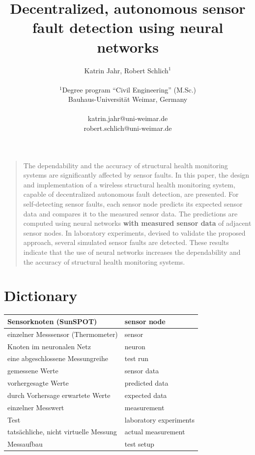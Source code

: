 \documentclass[12pt]{scrartcl}
\title{\textbf{ \Large{Decentralized, autonomous sensor fault detection using neural networks}} }
\author
{Katrin Jahr, Robert Schlich$^{1}$\\
\\
\normalsize{$^{1}$Degree program “Civil Engineering” (M.Sc.)}\\
\normalsize{Bauhaus-Universität Weimar, Germany}\\
\\
\normalsize{katrin.jahr@uni-weimar.de}\\
\normalsize{robert.schlich@uni-weimar.de}
}
\date{}
\newenvironment{sciabstract}{%
\begin{quote} \bfseries}
{\end{quote}}
\begin{document}
 


\baselineskip24pt


\maketitle 




\begin{sciabstract}

The dependability and the accuracy of structural health monitoring systems are significantly affected by sensor faults. 
In this paper, the design and implementation of a wireless structural health monitoring system, capable of decentralized autonomous fault detection, are presented. 
For self-detecting sensor faults, each sensor node predicts its expected sensor data and compares it to the measured sensor data. 
The predictions are computed using neural networks \textbf{with measured sensor data} of adjacent sensor nodes.
In laboratory experiments, devised to validate the proposed approach, several simulated sensor faults are detected.
These results indicate that the use of neural networks increases the dependability and the accuracy of structural health monitoring systems.

\end{sciabstract}


\linenumbers %
\section*{Dictionary}

\begin{tabular}{|l|l|}
\hline 
Sensorknoten (SunSPOT) & sensor node \\ 
\hline 
einzelner Messsensor (Thermometer) & sensor \\ 
\hline 
Knoten im neuronalen Netz & neuron \\ 
\hline 
eine abgeschlossene Messungreihe & test run \\ 
\hline 
gemessene Werte & sensor data \\ 
\hline 
vorhergesagte Werte & predicted data \\ 
\hline 
durch Vorhersage erwartete Werte & expected data \\ 
\hline 
einzelner Messwert & measurement \\ 
\hline 
Test & laboratory experiments\\ 
\hline
tatsächliche, nicht virtuelle Messung & actual measurement \\
\hline
Messaufbau & test setup \\
\hline

\end{tabular} 
\end{document}
